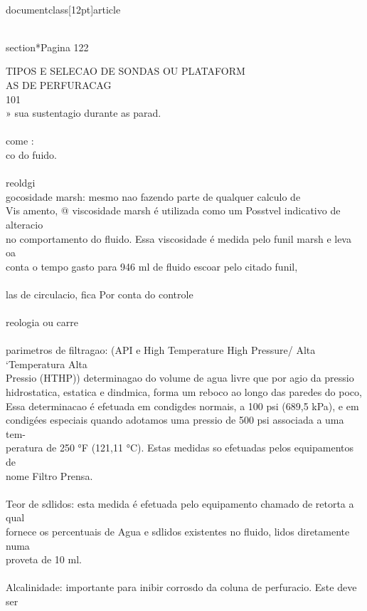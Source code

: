 \\documentclass[12pt]{article}
\begin{document}
\\section*{Pagina 122}

TIPOS E SELECAO DE SONDAS OU PLATAFORM\\
AS DE PERFURACAG\\
101\\
» sua sustentagio durante as parad.\\
\\
come :\\
co do fuido.\\
\\
reoldgi\\
gocosidade marsh: mesmo nao fazendo parte de qualquer calculo de\\
Vis amento, @ viscosidade marsh é utilizada como um Posstvel indicativo de alteracio\\
no comportamento do fluido. Essa viscosidade é medida pelo funil marsh e leva oa\\
conta o tempo gasto para 946 ml de fluido escoar pelo citado funil,\\
\\
las de circulacio, fica Por conta do controle\\
\\
reologia ou carre\\
\\
parimetros de filtragao: (API e High Temperature High Pressure/ Alta ‘Temperatura Alta\\
Pressio (HTHP)) determinagao do volume de agua livre que por agio da pressio\\
hidrostatica, estatica e dindmica, forma um reboco ao longo das paredes do poco,\\
Essa determinacao é efetuada em condigdes normais, a 100 psi (689,5 kPa), e em\\
condigées especiais quando adotamos uma pressio de 500 psi associada a uma tem-\\
peratura de 250 °F (121,11 °C). Estas medidas so efetuadas pelos equipamentos de\\
nome Filtro Prensa.\\
\\
Teor de sdlidos: esta medida é efetuada pelo equipamento chamado de retorta a qual\\
fornece os percentuais de Agua e sdlidos existentes no fluido, lidos diretamente numa\\
proveta de 10 ml.\\
\\
Alcalinidade: importante para inibir corrosdo da coluna de perfuracio. Este deve ser\\
\end{document}
